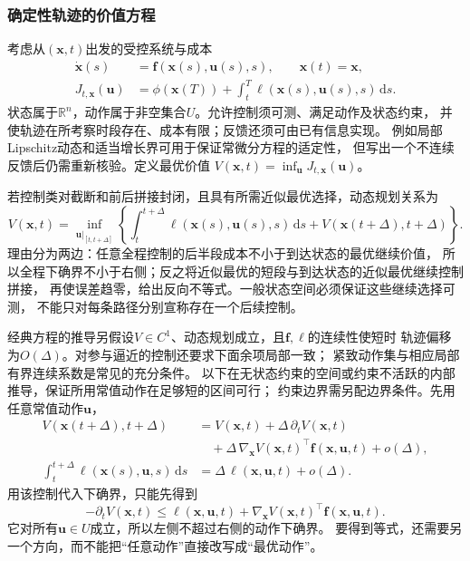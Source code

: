 \subsubsection{确定性轨迹的价值方程}

考虑从$(\bm x,t)$出发的受控系统与成本
\begin{align}
  \dot{\bm x}(s)&=\bm f(\bm x(s),\bm u(s),s),\qquad \bm x(t)=\bm x,
  \label{eq:control-continuous-dynamics}\\
  J_{t,\bm x}(\bm u)
  &=\phi(\bm x(T))+\int_t^T\ell(\bm x(s),\bm u(s),s)\,\mathrm ds.
  \label{eq:control-continuous-cost}
\end{align}
状态属于$\mathbb R^n$，动作属于非空集合$U$。允许控制须可测、满足动作及状态约束，
并使轨迹在所考察时段存在、成本有限；反馈还须可由已有信息实现。
例如局部Lipschitz动态和适当增长界可用于保证常微分方程的适定性，
但写出一个不连续反馈后仍需重新核验。定义最优价值
$V(\bm x,t)=\inf_{\bm u}J_{t,\bm x}(\bm u)$。

若控制类对截断和前后拼接封闭，且具有所需近似最优选择，动态规划关系为
\begin{equation}
  V(\bm x,t)=\inf_{\bm u|_{[t,t+\Delta]}}
  \left\{\int_t^{t+\Delta}\ell(\bm x(s),\bm u(s),s)\,\mathrm ds
    +V(\bm x(t+\Delta),t+\Delta)\right\}.
  \label{eq:control-continuous-dpp}
\end{equation}
理由分为两边：任意全程控制的后半段成本不小于到达状态的最优继续价值，
所以全程下确界不小于右侧；反之将近似最优的短段与到达状态的近似最优继续控制拼接，
再使误差趋零，给出反向不等式。一般状态空间必须保证这些继续选择可测，
不能只对每条路径分别宣称存在一个后续控制。

经典方程的推导另假设$V\in C^1$、动态规划成立，且$\bm f,\ell$的连续性使短时
轨迹偏移为$O(\Delta)$。对参与逼近的控制还要求下面余项局部一致；
紧致动作集与相应局部有界连续系数是常见的充分条件。
以下在无状态约束的空间或约束不活跃的内部推导，保证所用常值动作在足够短的区间可行；
约束边界需另配边界条件。先用任意常值动作$\bm u$，
\begin{align*}
  V(\bm x(t+\Delta),t+\Delta)
  &=V(\bm x,t)+\Delta\,\partial_tV(\bm x,t)\\
  &\quad+\Delta\,\nabla_{\bm x}V(\bm x,t)^\top\bm f(\bm x,\bm u,t)
    +o(\Delta),\\
  \int_t^{t+\Delta}\ell(\bm x(s),\bm u,s)\,\mathrm ds
  &=\Delta\,\ell(\bm x,\bm u,t)+o(\Delta).
\end{align*}
用该控制代入下确界，只能先得到
\[
  -\partial_tV(\bm x,t)
  \leq\ell(\bm x,\bm u,t)+\nabla_{\bm x}V(\bm x,t)^\top\bm f(\bm x,\bm u,t).
\]
它对所有$\bm u\in U$成立，所以左侧不超过右侧的动作下确界。
要得到等式，还需要另一个方向，而不能把“任意动作”直接改写成“最优动作”。

